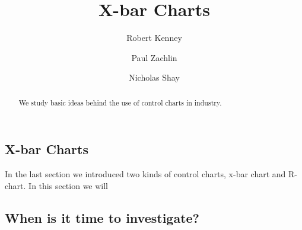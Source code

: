 \documentclass{ximera}
\author{Robert Kenney \and Paul Zachlin \and Nicholas Shay}
\title{X-bar Charts} \license{CC BY-NC-SA 4.0}
\begin{document}
\begin{abstract}
We study basic ideas behind the use of control charts in industry.
\end{abstract}
\maketitle

\begin{onlineOnly}
\section*{X-bar Charts}
\end{onlineOnly}

In the last section we introduced two kinds of control charts, x-bar chart and R-chart.  In this section we will 




\subsection*{When is it time to investigate?}
\end{document}
